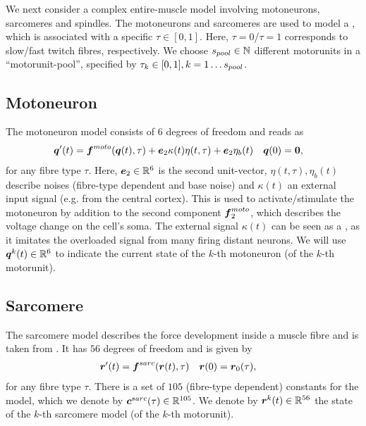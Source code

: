 We next consider a complex entire-muscle model involving motoneurons, sarcomeres and spindles.
The motoneurons and sarcomeres are used to model a , which is associated with a specific  $\tau\in[0,1]$.
Here, $\tau=0$/$\tau=1$ corresponds to slow/fast twitch fibres, respectively.
We choose ${s_{pool}}\in \mathbb{N}$ different motorunits in a ``motorunit-pool'', specified by $\tau_k\in[0,1], k=1\ldots{s_{pool}}$.

\subsection{Motoneuron}\label{sec:motoneuron}
The motoneuron model \cite{Cisi2008, negro2011} consists of $6$ degrees of freedom and reads as
\begin{align}
	\boldsymbol{q}'(t) &= \boldsymbol{f}^{moto}(\boldsymbol{q}(t),\tau) + \boldsymbol{e}_2\kappa(t)\eta(t,\tau) + \boldsymbol{e}_2\eta_b(t) & \boldsymbol{q}(0) &= \boldsymbol{0},\label{def:motosys}
\end{align}
for any fibre type $\tau$.
Here, $\boldsymbol{e}_2\in\mathbb{R}^6$ is the second unit-vector, $\eta(t,\tau),\eta_b(t)$ describe noises (fibre-type dependent and base noise)
and $\kappa(t)$ an external input signal (e.g. from the central cortex).
This is used to activate/stimulate the motoneuron by addition to the second component $\boldsymbol{f}^{moto}_2$, which describes the voltage change on the cell's soma.
The external signal $\kappa(t)$ can be seen as a , as it imitates the overloaded signal from many firing distant neurons.
We will use $\boldsymbol{q}^k(t) \in \mathbb{R}^6$ to indicate the current state of the $k$-th motoneuron (of the $k$-th motorunit).


\subsection{Sarcomere}
The sarcomere model describes the force development inside a muscle fibre and is taken from \cite{Shorten2007}.
It has $56$ degrees of freedom and is given by
\begin{align}
	\boldsymbol{r}'(t) &= \boldsymbol{f}^{sarc}(\boldsymbol{r}(t),\tau) & \boldsymbol{r}(0) &= \boldsymbol{r}_0(\tau),\label{def:sarcosys}
\end{align}
for any fibre type $\tau$.
There is a set of $105$ (fibre-type dependent) constants for the model, which we denote by $\boldsymbol{c}^{sarc}(\tau)\in\mathbb{R}^{105}$.
We denote by $\boldsymbol{r}^k(t)\in\mathbb{R}^{56}$ the state of the $k$-th sarcomere model (of the $k$-th motorunit).

